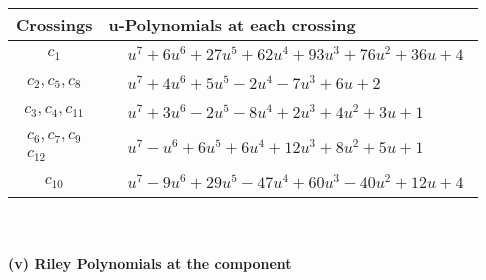 \documentclass[1p]{elsarticle_modified}
\theoremstyle{definition}
\begin{document}
\begin{tabular}{m{50pt}|m{274pt}}
Crossings & \hspace{64pt}u-Polynomials at each crossing \\
\hline $$\begin{aligned}c_{1}\end{aligned}$$&$\begin{aligned}
&u^7+6 u^6+27 u^5+62 u^4+93 u^3+76 u^2+36 u+4
\end{aligned}$\\
\hline $$\begin{aligned}c_{2},c_{5},c_{8}\end{aligned}$$&$\begin{aligned}
&u^7+4 u^6+5 u^5-2 u^4-7 u^3+6 u+2
\end{aligned}$\\
\hline $$\begin{aligned}c_{3},c_{4},c_{11}\end{aligned}$$&$\begin{aligned}
&u^7+3 u^6-2 u^5-8 u^4+2 u^3+4 u^2+3 u+1
\end{aligned}$\\
\hline $$\begin{aligned}c_{6},c_{7},c_{9}\\c_{12}\end{aligned}$$&$\begin{aligned}
&u^7- u^6+6 u^5+6 u^4+12 u^3+8 u^2+5 u+1
\end{aligned}$\\
\hline $$\begin{aligned}c_{10}\end{aligned}$$&$\begin{aligned}
&u^7-9 u^6+29 u^5-47 u^4+60 u^3-40 u^2+12 u+4
\end{aligned}$\\
\hline
\end{tabular}\\~\\
\newpage\renewcommand{\arraystretch}{1}
\flushleft \textbf{(v) Riley Polynomials at the component}\newline \\
\end{document}

